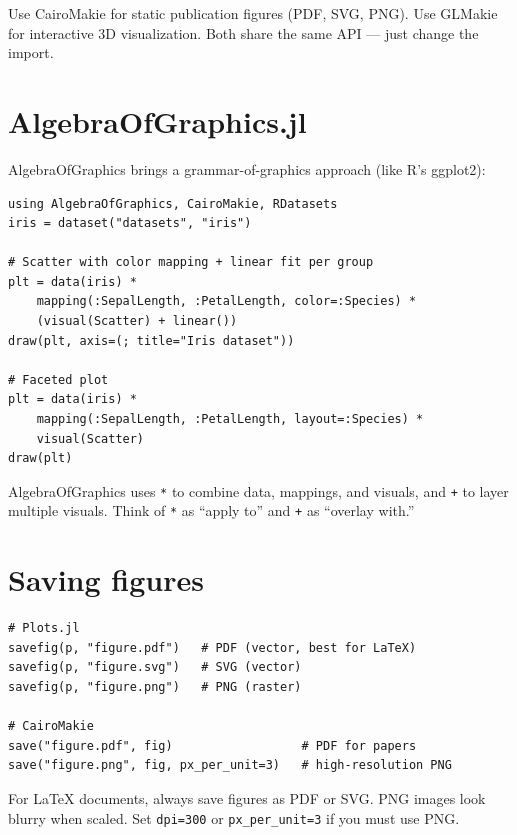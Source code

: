 \begin{performancetip}
Use CairoMakie for static publication figures (PDF, SVG, PNG). Use GLMakie for interactive 3D visualization. Both share the same API --- just change the import.
\end{performancetip}

\section{AlgebraOfGraphics.jl}

AlgebraOfGraphics brings a grammar-of-graphics approach (like R's ggplot2):

\begin{verbatim}
using AlgebraOfGraphics, CairoMakie, RDatasets
iris = dataset("datasets", "iris")

# Scatter with color mapping + linear fit per group
plt = data(iris) *
    mapping(:SepalLength, :PetalLength, color=:Species) *
    (visual(Scatter) + linear())
draw(plt, axis=(; title="Iris dataset"))

# Faceted plot
plt = data(iris) *
    mapping(:SepalLength, :PetalLength, layout=:Species) *
    visual(Scatter)
draw(plt)
\end{verbatim}

\begin{juliatip}
AlgebraOfGraphics uses \texttt{*} to combine data, mappings, and visuals, and \texttt{+} to layer multiple visuals. Think of \texttt{*} as ``apply to'' and \texttt{+} as ``overlay with.''
\end{juliatip}

\section{Saving figures}

\begin{verbatim}
# Plots.jl
savefig(p, "figure.pdf")   # PDF (vector, best for LaTeX)
savefig(p, "figure.svg")   # SVG (vector)
savefig(p, "figure.png")   # PNG (raster)

# CairoMakie
save("figure.pdf", fig)                  # PDF for papers
save("figure.png", fig, px_per_unit=3)   # high-resolution PNG
\end{verbatim}

\begin{warningbox}
For \LaTeX{} documents, always save figures as PDF or SVG. PNG images look blurry when scaled. Set \texttt{dpi=300} or \texttt{px\_per\_unit=3} if you must use PNG.
\end{warningbox}

